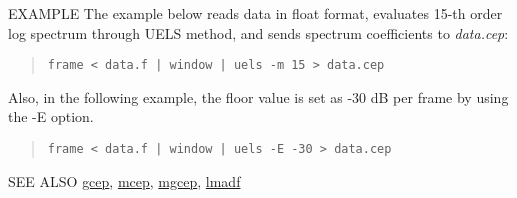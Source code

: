 \begin{qsection}{EXAMPLE}
The example below reads data in float format,
evaluates 15-th order log spectrum through UELS method,
and sends spectrum coefficients to {\em data.cep}:
\begin{quote}
 \verb!frame < data.f | window | uels -m 15 > data.cep!
\end{quote} 

Also, in the following example, the floor value is set as -30 dB per frame by using the -E option.
 \begin{quote}
 \verb!frame < data.f | window | uels -E -30 > data.cep !
 \end{quote}

\end{qsection}

\begin{qsection}{SEE ALSO}
\hyperlink{gcep}{gcep},
\hyperlink{mcep}{mcep},
\hyperlink{mgcep}{mgcep},
\hyperlink{lmadf}{lmadf}
\end{qsection}

